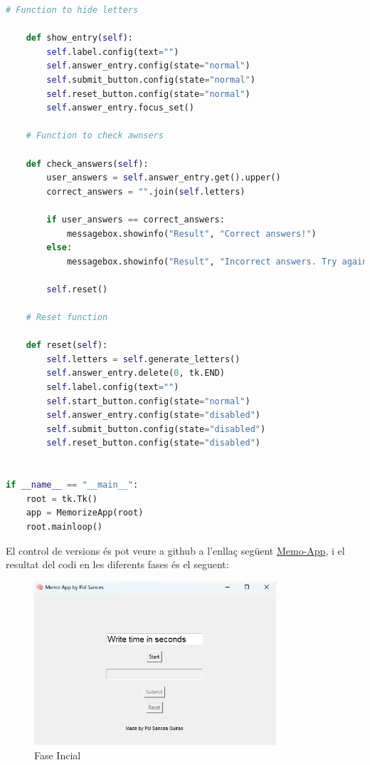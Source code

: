 \begin{lstlisting}[language=Python, style=colorEX, caption=Python example]
     # Function to hide letters

    def show_entry(self):
        self.label.config(text="")
        self.answer_entry.config(state="normal")
        self.submit_button.config(state="normal")
        self.reset_button.config(state="normal")
        self.answer_entry.focus_set()

    # Function to check awnsers 

    def check_answers(self):
        user_answers = self.answer_entry.get().upper()
        correct_answers = "".join(self.letters)

        if user_answers == correct_answers:
            messagebox.showinfo("Result", "Correct answers!")
        else:
            messagebox.showinfo("Result", "Incorrect answers. Try again.")

        self.reset()

    # Reset function

    def reset(self):
        self.letters = self.generate_letters()
        self.answer_entry.delete(0, tk.END)
        self.label.config(text="")
        self.start_button.config(state="normal")
        self.answer_entry.config(state="disabled")
        self.submit_button.config(state="disabled")
        self.reset_button.config(state="disabled")
   

if __name__ == "__main__":
    root = tk.Tk()
    app = MemorizeApp(root)
    root.mainloop()

    \end{lstlisting}

El control de versions és pot veure a github a l'enllaç següent \href{https://github.com/PolSances13/Memo-App}{Memo-App}, i el resultat del codi en les diferents fases és el seguent:

\begin{figure}[h!]
    \centering
    \includegraphics[width=9cm]{img/figures/app-fase1.png}
    \caption{Fase Incial}
    \label{fig:fase-incial}
\end{figure}

